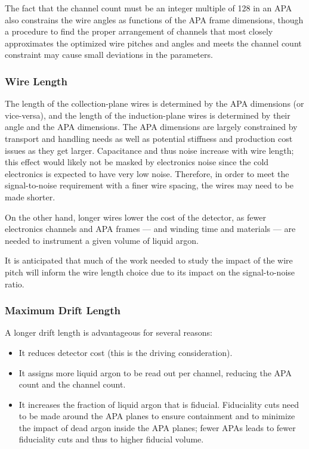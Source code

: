 The fact that the channel count must be an integer multiple of 128 in
an APA also constrains the wire angles as functions of the APA frame
dimensions, though a procedure to find the proper arrangement of
channels that most closely approximates the optimized wire pitches and
angles and meets the channel count constraint may cause small
deviations in the parameters.

\subsubsection{Wire Length}

The length of the collection-plane wires is determined by the APA
dimensions (or vice-versa), and the length of the induction-plane
wires is determined by their angle   and the APA dimensions.  The APA
dimensions %
are largely constrained by transport and handling needs %
as well as potential stiffness and production cost issues as they get larger.
Capacitance and thus noise increase with wire length; this effect would likely not
be masked by electronics noise since the 
cold electronics is
expected to have very low noise.  Therefore, in order to meet the
signal-to-noise requirement with a finer wire spacing, the wires may
need to be made shorter.

On the other hand, longer wires %
lower the cost of the detector, as fewer electronics
channels and APA frames --- and winding time and materials --- are needed to
instrument a given volume of liquid argon.

It is anticipated that much of the work needed to study the impact of
the wire pitch will inform the wire length choice due to its impact on
the signal-to-noise ratio.

\subsubsection{Maximum Drift Length}

A longer drift length is advantageous for several reasons:
\begin{itemize}
\item It reduces detector cost (this is the driving consideration).
\item It assigns more liquid argon to be read out per channel, reducing the APA count and the channel count.
\item It increases the fraction of liquid argon that is fiducial. Fiduciality cuts need to be made around the APA planes to ensure containment and to minimize the impact of dead argon inside the APA
planes; fewer APAs leads to fewer fiduciality cuts and thus to higher fiducial volume.
\end{itemize}

